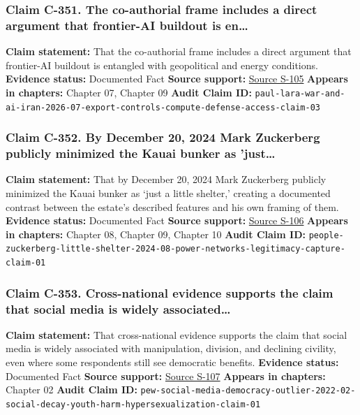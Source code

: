 \documentclass[
  american,
  11pt,
  letterpaper,
]{article}
\begin{document}
\subsubsection{Claim C-351. The co-authorial frame includes a direct
argument that frontier-AI buildout is
en\ldots{}}\label{claim-c-351-the-co-authorial-frame-includes-a-direct-argument-that-frontier-ai-buildout-is-en}

\textbf{Claim statement:} That the co-authorial frame includes a direct
argument that frontier-AI buildout is entangled with geopolitical and
energy conditions. \textbf{Evidence status:} Documented Fact
\textbf{Source support:}
\hyperref[source-s-105-guerra-e-ia-por-qu-le-urge-a-eu-terminar-con-ir-n]{Source
S-105} \textbf{Appears in chapters:} Chapter 07, Chapter 09
\textbf{Audit Claim ID:}
\texttt{paul-lara-war-and-ai-iran-2026-07-export-controls-compute-defense-access-claim-03}

\subsubsection{Claim C-352. By December 20, 2024 Mark Zuckerberg
publicly minimized the Kauai bunker as
'just\ldots{}}\label{claim-c-352-by-december-20-2024-mark-zuckerberg-publicly-minimized-the-kauai-bunker-as-just}

\textbf{Claim statement:} That by December 20, 2024 Mark Zuckerberg
publicly minimized the Kauai bunker as `just a little shelter,' creating
a documented contrast between the estate's described features and his
own framing of them. \textbf{Evidence status:} Documented Fact
\textbf{Source support:}
\hyperref[source-s-106-mark-zuckerberg-downplays-his-5-000-square-foot-underground-bunker-in-hawaii-just-a-little-shelter]{Source
S-106} \textbf{Appears in chapters:} Chapter 08, Chapter 09, Chapter 10
\textbf{Audit Claim ID:}
\texttt{people-zuckerberg-little-shelter-2024-08-power-networks-legitimacy-capture-claim-01}

\subsubsection{Claim C-353. Cross-national evidence supports the claim
that social media is widely
associated\ldots{}}\label{claim-c-353-cross-national-evidence-supports-the-claim-that-social-media-is-widely-associated}

\textbf{Claim statement:} That cross-national evidence supports the
claim that social media is widely associated with manipulation,
division, and declining civility, even where some respondents still see
democratic benefits. \textbf{Evidence status:} Documented Fact
\textbf{Source support:}
\hyperref[source-s-107-social-media-seen-as-mostly-good-for-democracy-across-many-nations-but-u-s-is-a-major-outlier]{Source
S-107} \textbf{Appears in chapters:} Chapter 02 \textbf{Audit Claim ID:}
\texttt{pew-social-media-democracy-outlier-2022-02-social-decay-youth-harm-hypersexualization-claim-01}
\end{document}
